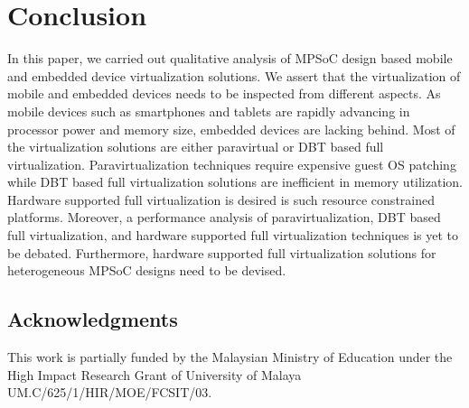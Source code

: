 \documentclass[journal, 10pt]{IEEEtran}
\begin{document}
\section{Conclusion}\label{sec:conc}
In this paper, we carried out qualitative analysis of MPSoC design based mobile and embedded device virtualization solutions. We assert that the virtualization of mobile and embedded devices needs to be inspected from different aspects. As mobile devices such as smartphones and tablets are rapidly advancing in processor power and memory size, embedded devices are lacking behind. Most of the virtualization solutions are either paravirtual or DBT based full virtualization. Paravirtualization techniques require expensive guest OS patching while DBT based full virtualization solutions are inefficient in memory utilization. Hardware supported full virtualization is desired is such resource constrained platforms. Moreover, a performance analysis of paravirtualization, DBT based full virtualization, and hardware supported full virtualization techniques is yet to be debated. Furthermore, hardware supported full virtualization solutions for heterogeneous MPSoC designs need to be devised. 
\subsection*{Acknowledgments}
This work is partially funded by the Malaysian Ministry of Education under the High Impact Research Grant of University of Malaya UM.C/625/1/HIR/MOE/FCSIT/03.



\end{document}
